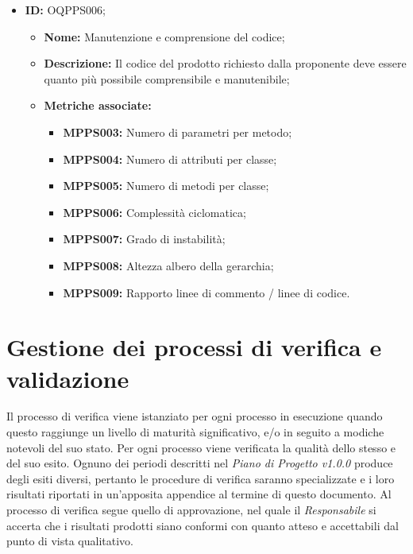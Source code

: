 \documentclass[openany,12pt,a4paper]{report}
\begin{document}
        \begin{itemize}
            \item \textbf{ID:} OQPPS006;
            \begin{itemize} 
            	\item \textbf{Nome:} Manutenzione e comprensione del codice;
            	\item \textbf{Descrizione:} Il codice del prodotto richiesto dalla proponente deve essere quanto più possibile comprensibile e manutenibile;
            	\item \textbf{Metriche associate:} 
                \begin{itemize}
                    \item \textbf{MPPS003:} Numero di parametri per metodo;
                    \item \textbf{MPPS004:} Numero di attributi per classe;
                    \item \textbf{MPPS005:} Numero di metodi per classe;
                    \item \textbf{MPPS006:} Complessità ciclomatica;
                    \item \textbf{MPPS007:} Grado di instabilità;
                    \item \textbf{MPPS008:} Altezza albero della gerarchia;
                    \item \textbf{MPPS009:} Rapporto linee di commento / linee di codice.
                \end{itemize}
            \end{itemize}
        \end{itemize}

    \section{Gestione dei processi di verifica e validazione}
        
    Il processo di verifica viene istanziato per ogni processo in esecuzione quando questo raggiunge un livello di maturità significativo, e/o in seguito a modiche notevoli del suo stato. Per ogni processo viene verificata la qualità dello stesso e del suo esito. 
    Ognuno dei periodi descritti nel \textit{Piano di Progetto v1.0.0} produce degli esiti diversi, pertanto le procedure di verifica saranno specializzate e i loro risultati riportati in un'apposita appendice al termine di questo documento. 
    Al processo di verifica segue quello di approvazione, nel quale il \textit{Responsabile} si accerta che i risultati prodotti siano conformi con quanto atteso e accettabili dal punto di vista qualitativo.
\end{document}
